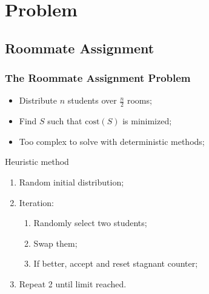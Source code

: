 \section{Problem}
\label{sec:problem}

\subsection{Roommate Assignment}
\begin{frame}
	\frametitle{The Roommate Assignment Problem}
	\begin{itemize}
		\item{Distribute $n$ students over $\frac{n}{2}$ rooms;}
		\vfill
		\item{Find $S$ such that $\mathrm{cost}(S)$ is minimized;}
		\vfill
		\item{Too complex to solve with deterministic methods;}
	\end{itemize}
\pause
	\begin{block}{Heuristic method}
		\begin{enumerate}
			\item{Random initial distribution;}
			\item{Iteration:
			\begin{enumerate}
				\item{Randomly select two students;}
				\item{Swap them;}
				\item{If better, accept and reset stagnant counter;}
			\end{enumerate}
			}
			\item{Repeat 2 until limit reached.}
		\end{enumerate}
	\end{block}
\end{frame}

